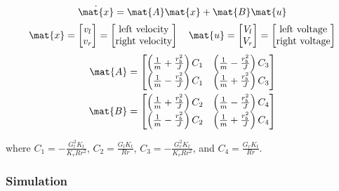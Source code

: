 \begin{theorem}
  \label{thm:diff_drive_velocity_state-space_model}
  \begin{equation*}
    \dot{\mat{x}} = \mat{A} \mat{x} + \mat{B} \mat{u}
  \end{equation*}
  \begin{equation*}
    \mat{x} =
    \begin{bmatrix}
      v_l \\
      v_r
    \end{bmatrix} =
    \begin{bmatrix}
      \text{left velocity} \\
      \text{right velocity}
    \end{bmatrix}
    \quad
    \mat{u} =
    \begin{bmatrix}
      V_l \\
      V_r
    \end{bmatrix} =
    \begin{bmatrix}
      \text{left voltage} \\
      \text{right voltage}
    \end{bmatrix}
  \end{equation*}
  \begin{align}
    \mat{A} &=
    \begin{bmatrix}
      \left(\frac{1}{m} + \frac{r_b^2}{J}\right) C_1 & \left(\frac{1}{m} - \frac{r_b^2}{J}\right) C_3 \\
      \left(\frac{1}{m} - \frac{r_b^2}{J}\right) C_1 & \left(\frac{1}{m} + \frac{r_b^2}{J}\right) C_3
    \end{bmatrix} \\
    \mat{B} &=
    \begin{bmatrix}
      \left(\frac{1}{m} + \frac{r_b^2}{J}\right) C_2 & \left(\frac{1}{m} - \frac{r_b^2}{J}\right) C_4 \\
      \left(\frac{1}{m} - \frac{r_b^2}{J}\right) C_2 & \left(\frac{1}{m} + \frac{r_b^2}{J}\right) C_4
    \end{bmatrix}
  \end{align}

  where $C_1 = -\frac{G_l^2 K_t}{K_v R r^2}$, $C_2 = \frac{G_l K_t}{Rr}$,
  $C_3 = -\frac{G_r^2 K_t}{K_v R r^2}$, and $C_4 = \frac{G_r K_t}{Rr}$.
\end{theorem}

\subsubsection{Simulation}

